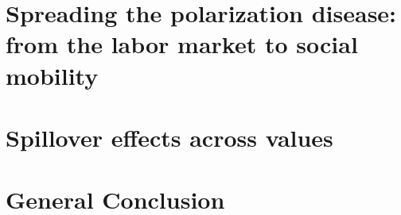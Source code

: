 \documentclass{amse_these}
\begin{document}
	\chapter{Spreading the polarization disease: from the labor market to social mobility}\label{chap2}
	

	\chapter{Spillover effects across values}\label{chap3}
	

	\chapter*{General Conclusion}
	
\end{document}
